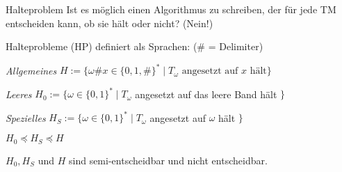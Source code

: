 \begin{concept}{Halteproblem}
    Ist es möglich einen Algorithmus zu schreiben, der für jede TM entscheiden kann, ob sie hält oder nicht? (Nein!)
    
    \vspace*{1mm}

    Halteprobleme (HP) definiert als Sprachen: {\small(\# = Delimiter)}

    \vspace*{1mm}

    \emph{Allgemeines} $H :=\{\omega \# x \in\{0,1, \#\}^{*} \mid T_{\omega} \text{ angesetzt auf } x \text{ hält} \}$

    \emph{Leeres} $H_{0}:=\{\omega \in\{0,1\}^{*} \mid T_{\omega}$ angesetzt auf das leere Band hält $\}$ 
    
    \emph{Spezielles} $H_{S}:=\{\omega \in\{0,1\}^{*} \mid T_{\omega}$ angesetzt auf $\omega$ hält $\}$

    \vspace*{1mm}

    {\small
    $H_{0} \preccurlyeq H_{S} \preccurlyeq H$

    $H_{0}, H_{S}$ und $H$ sind semi-entscheidbar und nicht entscheidbar.
    }
\end{concept}